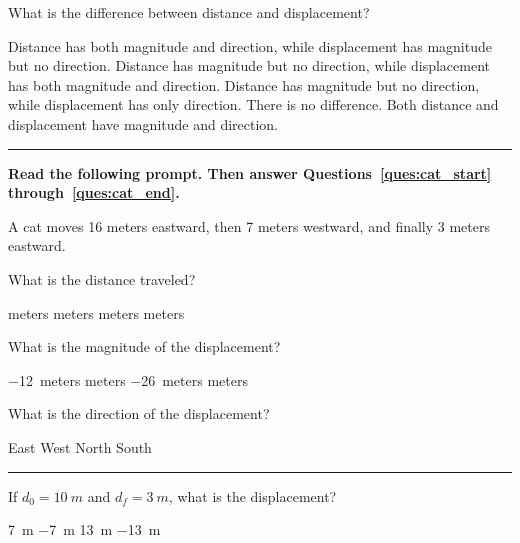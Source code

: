 \documentclass[]{exam}
\begin{document}
\begin{questions}



\question %
What is the difference between distance and displacement?

\begin{choices}
\choice Distance has both magnitude and direction, while displacement has magnitude but no direction.
\CorrectChoice Distance has magnitude but no direction, while displacement has both magnitude and direction.
\choice Distance has magnitude but no direction, while displacement has only direction.
\choice There is no difference. Both distance and displacement have magnitude and direction.
\end{choices}

\vspace{1em} \hrule 

\begin{EnvUplevel}
\textbf{Read the following prompt. Then answer Questions~\ref{ques:cat_start} through~\ref{ques:cat_end}.}

A cat moves 16 meters eastward, then 7 meters westward, and finally 3 meters eastward. 
\end{EnvUplevel}



\question \label{ques:cat_start}
What is the distance traveled?

\begin{choices}
 meters
 meters
 meters
 meters
\end{choices}

\question
What is the magnitude of the displacement?

\begin{choices}
\choice \SI{-12}{meters}
 meters
\choice \SI{-26}{meters}
 meters
\end{choices}

\question \label{ques:cat_end}
What is the direction of the displacement?

\begin{choices}
\CorrectChoice East
\choice West
\choice North
\choice South
\end{choices}

\vspace{1em} \hrule

\question
If $d_0 = \SI{10}{m}$ and $d_f = \SI{3}{m}$, what is the displacement?

\begin{choices}
\choice \SI{7}{m}
\CorrectChoice \SI{-7}{m} 
\choice \SI{13}{m}
\choice \SI{-13}{m}
\end{choices}


\end{questions}
\end{document}
